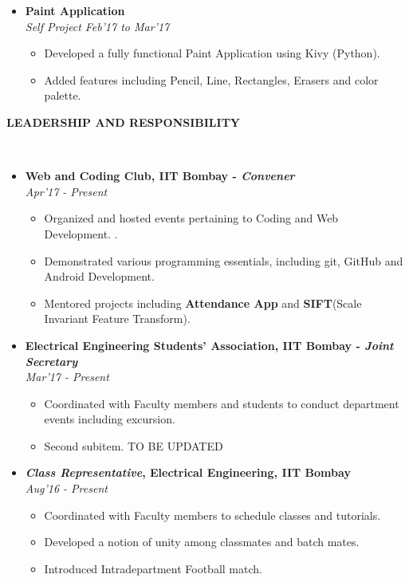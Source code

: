 \documentclass[a4paper,10pt]{article}
\newcommand{\isep}{-2 pt}
\newcommand{\lsep}{-0.5cm}
\newcommand{\resheading}[1]{{\small \colorbox{mygrey}{\begin{minipage}{0.975\textwidth}{\textbf{#1 \vphantom{p\^{E}}}}\end{minipage}}}}
\begin{document}
\begin{itemize}
 \item \textbf{Paint Application} \\
 \emph{ Self Project} \hfill {\em \emph{Feb'17 to Mar'17}}
 \begin{itemize}\itemsep \isep
 \item Developed a fully functional Paint Application using Kivy (Python).
 \item Added features including Pencil, Line, Rectangles, Erasers and color palette.
 \end{itemize}
 
\end{itemize}

\resheading{\textbf{LEADERSHIP AND RESPONSIBILITY} }\\[\lsep]
\begin{itemize}
\item \textbf{Web and Coding Club, IIT Bombay - \emph{Convener} 
}  \\
 \emph{Apr'17 - Present} \\[-0.6cm]
	\begin{itemize}\itemsep \isep
	\item Organized and hosted events pertaining to Coding and Web Development.
.
	\item Demonstrated various programming essentials, including git, GitHub and Android Development.

	\item Mentored projects including \textbf{Attendance App} and \textbf{SIFT}(Scale Invariant Feature Transform).

	\end{itemize}

\item \textbf{Electrical Engineering Students' Association, IIT Bombay - \emph{Joint Secretary}
}  \\
 \emph{ Mar'17 - Present} \\[-0.6cm]
	\begin{itemize}\itemsep \isep
	\item Coordinated with Faculty members and students to conduct department events including excursion.
	\item Second subitem. TO BE UPDATED
	\end{itemize}

\item \textbf{\emph{Class Representative}, Electrical Engineering, IIT Bombay
}  \\
 \emph{ Aug'16 - Present} \\[-0.6cm]
	\begin{itemize}\itemsep \isep
	\item Coordinated with Faculty members to schedule classes and tutorials.
	\item Developed a notion of unity among classmates and batch mates.
	\item Introduced Intradepartment Football match.
	\end{itemize}
\end{itemize}
\end{document}

